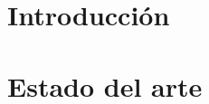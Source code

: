 \documentclass[letterpaper, 11pt]{report}
\begin{document}
  \hypersetup{pageanchor=false}
  
  \hypersetup{pageanchor=true}



  \tableofcontents

  \newpage

\newpage




  \chapter{Introducción}\label{chap:intro}
  

  \chapter{Estado del arte}\label{chap:estado_del_arte}
  

\end{document}
